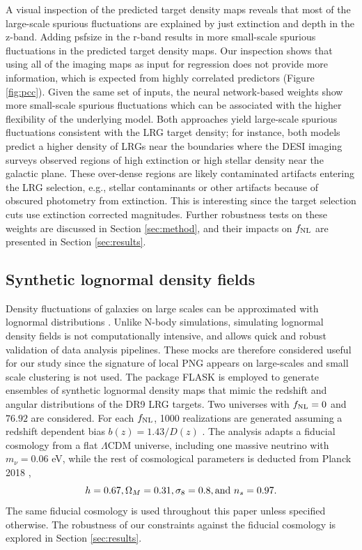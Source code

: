 A visual inspection of the predicted target density maps reveals that most of the large-scale spurious fluctuations are explained by just extinction and depth in the z-band. Adding psfsize in the r-band results in more small-scale spurious fluctuations in the predicted target density maps. Our inspection shows that using all of the imaging maps as input for regression does not provide more information, which is expected from highly correlated predictors (Figure \ref{fig:pcc}). Given the same set of inputs, the neural network-based weights show more small-scale spurious fluctuations which can be associated with the higher flexibility of the underlying model. Both approaches yield large-scale spurious fluctuations consistent with the LRG target density; for instance, both models predict a higher density of LRGs near the boundaries where the DESI imaging surveys observed regions of high extinction or high stellar density near the galactic plane. These over-dense regions are likely contaminated artifacts entering the LRG selection, e.g., stellar contaminants or other artifacts because of obscured photometry from extinction. This is interesting since the target selection cuts use extinction corrected magnitudes. Further robustness tests on these weights are discussed in Section \ref{sec:method}, and their impacts on $f_{\rm NL}$ are presented in Section \ref{sec:results}.


\subsection{Synthetic lognormal density fields}\label{ssec:mocks}
Density fluctuations of galaxies on large scales can be approximated with lognormal distributions \citep{coles1991}. Unlike N-body simulations, simulating lognormal density fields is not computationally intensive, and allows quick and robust validation of data analysis pipelines. These mocks are therefore considered useful for our study since the signature of local PNG appears on large-scales and small scale clustering is not used. The package \textsc{FLASK} \citep[Full-sky Lognormal Astro-fields Simulation Kit;][]{Xavier_2016} is employed to generate ensembles of synthetic lognormal density maps that mimic the redshift and angular distributions of the DR9 LRG targets. Two universes with $f_{\rm NL}=0$ and $76.92$ are considered. For each $f_{\rm NL}$, 1000 realizations are generated assuming a redshift dependent bias $b(z)=1.43/D(z)$ \citep[see, e.g.,][]{zhou2021clustering}. The analysis adapts a fiducial cosmology from a flat $\Lambda$CDM universe, including one massive neutrino with $m_{\nu}=0.06$ eV, while the rest of cosmological parameters is deducted from Planck 2018 \citep{aghanim2020planck},
\begin{equation*}
 h = 0.67, \Omega_{M}=0.31, \sigma_{8}=0.8, {\rm and}~ n_{s}=0.97.
\end{equation*}
The same fiducial cosmology is used throughout this paper unless specified otherwise. The robustness of our constraints against the fiducial cosmology is explored in Section \ref{sec:results}.


